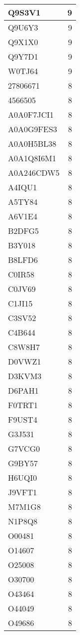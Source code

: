\documentclass[
]{book}
\theoremstyle{definition}
\theoremstyle{definition}
\theoremstyle{definition}
\theoremstyle{definition}
\theoremstyle{remark}
\begin{document}
\begin{table}
\begin{tabular}{l|r}
\hline
Q9S3V1 & 9\\
\hline
Q9U6Y3 & 9\\
\hline
Q9X1X0 & 9\\
\hline
Q9Y7D1 & 9\\
\hline
W0TJ64 & 9\\
\hline
27806671 & 8\\
\hline
4566505 & 8\\
\hline
A0A0F7JCI1 & 8\\
\hline
A0A0G9FES3 & 8\\
\hline
A0A0H5BL38 & 8\\
\hline
A0A1Q8I6M1 & 8\\
\hline
A0A246CDW5 & 8\\
\hline
A4IQU1 & 8\\
\hline
A5TY84 & 8\\
\hline
A6V1E4 & 8\\
\hline
B2DFG5 & 8\\
\hline
B3Y018 & 8\\
\hline
B8LFD6 & 8\\
\hline
C0IR58 & 8\\
\hline
C0JV69 & 8\\
\hline
C1JI15 & 8\\
\hline
C3SV52 & 8\\
\hline
C4B644 & 8\\
\hline
C8W8H7 & 8\\
\hline
D0VWZ1 & 8\\
\hline
D3KVM3 & 8\\
\hline
D6PAH1 & 8\\
\hline
F0TRT1 & 8\\
\hline
F9UST4 & 8\\
\hline
G3J531 & 8\\
\hline
G7VCG0 & 8\\
\hline
G9BY57 & 8\\
\hline
H6UQI0 & 8\\
\hline
J9VFT1 & 8\\
\hline
M7M1G8 & 8\\
\hline
N1P8Q8 & 8\\
\hline
O00481 & 8\\
\hline
O14607 & 8\\
\hline
O25008 & 8\\
\hline
O30700 & 8\\
\hline
O43464 & 8\\
\hline
O44049 & 8\\
\hline
O49686 & 8\\

\end{tabular}
\end{table}
\end{document}
